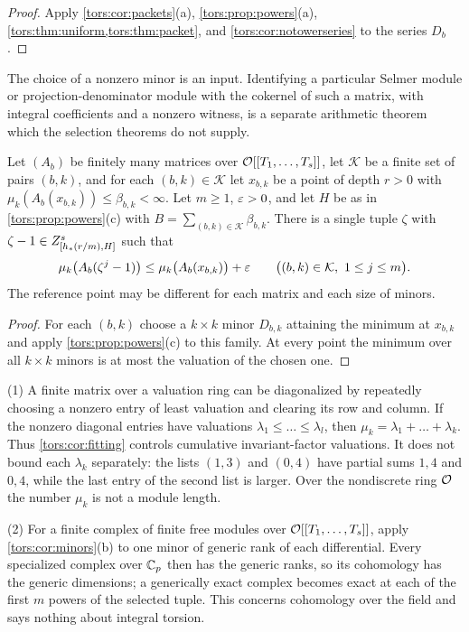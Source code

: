 \begin{proof}
Apply \cref{tors:cor:packets}(a), \cref{tors:prop:powers}(a),
\cref{tors:thm:uniform,tors:thm:packet}, and \cref{tors:cor:notowerseries} to the series
$D_b$.
\end{proof}

The choice of a nonzero minor is an input. Identifying a particular Selmer module or
projection-denominator module with the cokernel of such a matrix, with integral
coefficients and a nonzero witness, is a separate arithmetic theorem which the selection
theorems do not supply.

\begin{corollary}\label{tors:cor:fitting}
Let $(A_b)$ be finitely many matrices over $\mathcal{O}[[T_1,\dots,T_s]]$, let $\mathcal K$ be a
finite set of pairs $(b,k)$, and for each $(b,k)\in\mathcal K$ let $x_{b,k}$ be a point of
depth $r>0$ with $\mu_k(A_b(x_{b,k}))\le\beta_{b,k}<\infty$. Let $m\ge1$, $\varepsilon>0$, and
let $H$ be as in \cref{tors:prop:powers}\textup{(c)} with
$B=\sum_{(b,k)\in\mathcal K}\beta_{b,k}$. There is a single tuple $\zeta$ with
$\zeta-1\in Z_{[h_*(r/m),H]}^s$ such that
\[
  \mu_k\bigl(A_b(\zeta^j-1)\bigr)\le\mu_k\bigl(A_b(x_{b,k})\bigr)+\varepsilon
  \qquad\bigl((b,k)\in\mathcal K,\ 1\le j\le m\bigr).
\]
The reference point may be different for each matrix and each size of minors.
\end{corollary}

\begin{proof}
For each $(b,k)$ choose a $k\times k$ minor $D_{b,k}$ attaining the minimum at
$x_{b,k}$ and apply \cref{tors:prop:powers}(c) to this family. At every point the minimum
over all $k\times k$ minors is at most the valuation of the chosen one.
\end{proof}

\begin{remark}\label{tors:rem:fitting}
(1) A finite matrix over a valuation ring can be diagonalized by repeatedly choosing a
nonzero entry of least valuation and clearing its row and column. If the nonzero diagonal
entries have valuations $\lambda_1\le\dots\le\lambda_l$, then
$\mu_k=\lambda_1+\dots+\lambda_k$. Thus \cref{tors:cor:fitting} controls cumulative
invariant-factor valuations. It does not bound each $\lambda_k$ separately: the lists
$(1,3)$ and $(0,4)$ have partial sums $1,4$ and $0,4$, while the last entry of the second
list is larger. Over the nondiscrete ring $\mathcal{O}$ the number $\mu_k$ is not a module length.

(2) For a finite complex of finite free modules over $\mathcal{O}[[T_1,\dots,T_s]]$, apply
\cref{tors:cor:minors}(b) to one minor of generic rank of each differential. Every
specialized complex over $\mathbb{C}_p$ then has the generic ranks, so its cohomology has the
generic dimensions; a generically exact complex becomes exact at each of the first $m$
powers of the selected tuple. This concerns cohomology over the field and says nothing
about integral torsion.
\end{remark}

